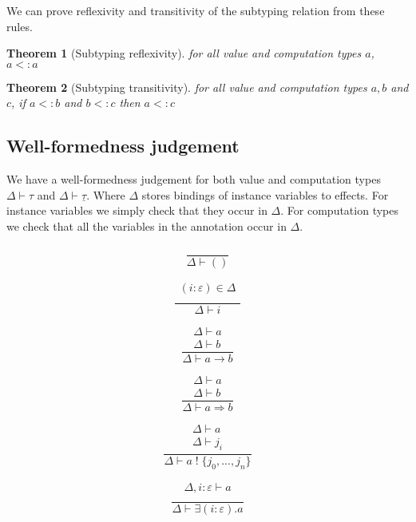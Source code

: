 \documentclass[12pt]{article}
\newtheorem{theorem}{Theorem}
\newcommand\eff[0]{\varepsilon}
\newcommand\ty[0]{\tau}
\newcommand\tunit[0]{()}
\newcommand\tarr[2]{#1 \rightarrow #2}
\newcommand\thandler[2]{#1 \Rightarrow #2}
\newcommand\cty[0]{\underline{\ty}}
\newcommand\aty[2]{#1 \; ! \; #2}
\newcommand\texists[3]{\exists(#1:#2) . #3}
\newcommand\subty[2]{#1 <: #2}
\begin{document}
We can prove reflexivity and transitivity of the subtyping relation from these rules.
\begin{theorem}[Subtyping reflexivity]
for all value and computation types $a$, $\subty{a}{a}$
\end{theorem}
\begin{theorem}[Subtyping transitivity]
for all value and computation types $a, b$ and $c$, if $\subty{a}{b}$ and $\subty{b}{c}$ then $\subty{a}{c}$
\end{theorem}

\newpage
\subsection{Well-formedness judgement}
We have a well-formedness judgement for both value and computation types $\Delta \vdash \ty$ and $\Delta \vdash \cty$.
Where $\Delta$ stores bindings of instance variables to effects.
For instance variables we simply check that they occur in $\Delta$.
For computation types we check that all the variables in the annotation occur in $\Delta$.
\\

\begin{minipage}{0.25\textwidth}
\[\frac{
	\begin{array}{l}
	\end{array}
}{
	\Delta \vdash \tunit
}\]
\end{minipage}
\begin{minipage}{0.25\textwidth}
\[\frac{
	\begin{array}{l}
	(i : \eff) \in \Delta \\
	\end{array}
}{
	\Delta \vdash i
}\]
\end{minipage}
\begin{minipage}{0.25\textwidth}
\[\frac{
	\begin{array}{l}
	\Delta \vdash a  \\
	\Delta \vdash b
	\end{array}
}{
	\Delta \vdash \tarr{a}{b}
}\]
\end{minipage}
\begin{minipage}{0.25\textwidth}
\[\frac{
	\begin{array}{l}
	\Delta \vdash a  \\
	\Delta \vdash b
	\end{array}
}{
	\Delta \vdash \thandler{a}{b}
}\]
\end{minipage}
\begin{minipage}{0.5\textwidth}
\[\frac{
	\begin{array}{l}
	\Delta \vdash a  \\
	\Delta \vdash j_i
	\end{array}
}{
	\Delta \vdash \aty{a}{\{ j_0, ..., j_n \}}
}\]
\end{minipage}
\begin{minipage}{0.5\textwidth}
\[\frac{
	\begin{array}{l}
	\Delta , i : \eff \vdash a  \\
	\end{array}
}{
	\Delta \vdash \texists{i}{\eff}{a}
}\]
\end{minipage}
\end{document}
